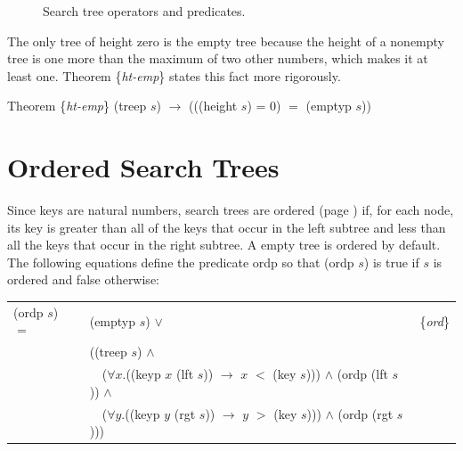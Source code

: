 \begin{figure}
\caption{Search tree operators and predicates.}
\label{fig:tree-functions}
\end{figure}

The only tree of height zero is the empty tree because
the height of a nonempty tree is one more than the maximum
of two other numbers, which makes it at least one.
Theorem \{\emph{ht-emp}\} states this fact more rigorously.

\label{thm:ht-emp}
Theorem \{\emph{ht-emp}\} \textsf{(treep $s$)} $\rightarrow$ ((\textsf{(height $s$) = 0)} $=$ \textsf{(emptyp $s$)})

\section{Ordered Search Trees}

Since keys are natural numbers,
search trees are ordered (page \pageref{ordered-def}) if, for each node,
its key is greater than all of the keys that occur in the left subtree
and less than all the keys that occur in the right subtree.
A empty tree is ordered by default.
The following equations define
the predicate \textsf{ordp} so that
\textsf{(ordp $s$)} is true if $s$ is ordered and false otherwise:

\begin{center}
\label{def:ordp}
\begin{tabular}{lll}
\textsf{(ordp $s$)} $=$ & \textsf{(emptyp $s$)} $\vee$ & \{\emph{ord}\} \\
             & (\textsf{(treep $s$)}  $\wedge$                        \\
             & ~~($\forall x$.(\textsf{(keyp $x$ (lft $s$)}) $\rightarrow$ $x$ $<$ \textsf{(key $s$)})) $\wedge$ \textsf{(ordp (lft $s$))} $\wedge$ & \\
             & ~~($\forall y$.(\textsf{(keyp $y$ (rgt $s$))} $\rightarrow$ $y$ $>$ \textsf{(key $s$)})) $\wedge$ \textsf{(ordp (rgt $s$))})         & \\
\end{tabular}
\end{center}


